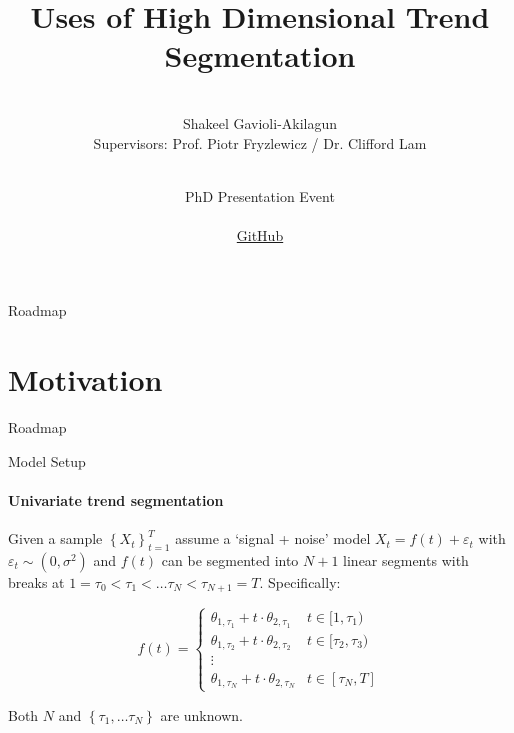 \documentclass{beamer}
\title[Trend Segmentation]{Uses of High Dimensional Trend Segmentation}
\institute[LSE Department of Statistics]{}
\author[]{
\\
  {Shakeel Gavioli-Akilagun} \\
  \bigskip
  \footnotesize{Supervisors: Prof. Piotr Fryzlewicz / Dr. Clifford Lam}
}
\date[02 June 2020]{
  \hspace{1cm}\\
  PhD Presentation Event\\
  \hspace{1cm}\\
  {\fontfamily{pcr}\selectfont \href{https://github.com/Shakeel95/PhD-Presentation-1}{GitHub} }
}
\begin{document}

\begin{frame}
  \titlepage
\end{frame}




\begin{frame}{Roadmap}
  \tableofcontents
\end{frame}




\section{Motivation}




\begin{frame}{Roadmap}
\tableofcontents[currentsection]
\end{frame}






\begin{frame}{Model Setup}
\framesubtitle{Univariate trend segmentation}

Given a sample $\left \{ X_t \right \}_{t=1}^{T}$ assume a `signal + noise' model $X_t = f(t) + \varepsilon_t$ with $\varepsilon_t \sim \left ( 0, \sigma^2 \right )$ and $f(t)$ can be segmented into $N+1$ linear segments with breaks at $1 = \tau_0 < \tau_1 < \dots \tau_N < \tau_{N+1}=T$. Specifically: 

\bigskip

\begin{equation*}
f(t) = 
\left\{\begin{matrix}
        \theta_{1,\tau_1} + t \cdot \theta_{2,\tau_1} & t \in [1, \tau_1) \\ 
        \theta_{1,\tau_2} + t \cdot \theta_{2,\tau_2} & t \in [\tau_2, \tau_3)\\ 
        \vdots & \\ 
        \theta_{1,\tau_N} + t \cdot \theta_{2,\tau_N} & t \in [\tau_N,T]
\end{matrix}\right.
\end{equation*}

\bigskip

Both $N$ and $\left \{ \tau_1, \dots \tau_N \right \}$ are unknown.

\end{frame}
\end{document}
